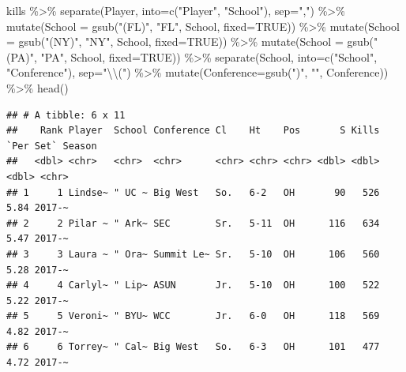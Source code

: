 \documentclass[
]{book}
\newenvironment{Shaded}{\begin{snugshade}}{\end{snugshade}}
\newcommand{\AttributeTok}[1]{\textcolor[rgb]{0.77,0.63,0.00}{#1}}
\newcommand{\ConstantTok}[1]{\textcolor[rgb]{0.00,0.00,0.00}{#1}}
\newcommand{\FunctionTok}[1]{\textcolor[rgb]{0.00,0.00,0.00}{#1}}
\newcommand{\NormalTok}[1]{#1}
\newcommand{\SpecialCharTok}[1]{\textcolor[rgb]{0.00,0.00,0.00}{#1}}
\newcommand{\StringTok}[1]{\textcolor[rgb]{0.31,0.60,0.02}{#1}}
\begin{document}
\begin{Shaded}
\begin{Highlighting}[]
\NormalTok{kills }\SpecialCharTok{\%\textgreater{}\%} 
  \FunctionTok{separate}\NormalTok{(Player, }\AttributeTok{into=}\FunctionTok{c}\NormalTok{(}\StringTok{"Player"}\NormalTok{, }\StringTok{"School"}\NormalTok{), }\AttributeTok{sep=}\StringTok{","}\NormalTok{) }\SpecialCharTok{\%\textgreater{}\%} 
  \FunctionTok{mutate}\NormalTok{(}\AttributeTok{School =} \FunctionTok{gsub}\NormalTok{(}\StringTok{"(FL)"}\NormalTok{, }\StringTok{"FL"}\NormalTok{, School, }\AttributeTok{fixed=}\ConstantTok{TRUE}\NormalTok{)) }\SpecialCharTok{\%\textgreater{}\%}
  \FunctionTok{mutate}\NormalTok{(}\AttributeTok{School =} \FunctionTok{gsub}\NormalTok{(}\StringTok{"(NY)"}\NormalTok{, }\StringTok{"NY"}\NormalTok{, School, }\AttributeTok{fixed=}\ConstantTok{TRUE}\NormalTok{)) }\SpecialCharTok{\%\textgreater{}\%}
  \FunctionTok{mutate}\NormalTok{(}\AttributeTok{School =} \FunctionTok{gsub}\NormalTok{(}\StringTok{"(PA)"}\NormalTok{, }\StringTok{"PA"}\NormalTok{, School, }\AttributeTok{fixed=}\ConstantTok{TRUE}\NormalTok{)) }\SpecialCharTok{\%\textgreater{}\%}
  \FunctionTok{separate}\NormalTok{(School, }\AttributeTok{into=}\FunctionTok{c}\NormalTok{(}\StringTok{"School"}\NormalTok{, }\StringTok{"Conference"}\NormalTok{), }\AttributeTok{sep=}\StringTok{"}\SpecialCharTok{\textbackslash{}\textbackslash{}}\StringTok{("}\NormalTok{) }\SpecialCharTok{\%\textgreater{}\%} 
  \FunctionTok{mutate}\NormalTok{(}\AttributeTok{Conference=}\FunctionTok{gsub}\NormalTok{(}\StringTok{")"}\NormalTok{, }\StringTok{""}\NormalTok{, Conference)) }\SpecialCharTok{\%\textgreater{}\%}
  \FunctionTok{head}\NormalTok{()}
\end{Highlighting}
\end{Shaded}

\begin{verbatim}
## # A tibble: 6 x 11
##    Rank Player  School Conference Cl    Ht    Pos       S Kills `Per Set` Season
##   <dbl> <chr>   <chr>  <chr>      <chr> <chr> <chr> <dbl> <dbl>     <dbl> <chr> 
## 1     1 Lindse~ " UC ~ Big West   So.   6-2   OH       90   526      5.84 2017-~
## 2     2 Pilar ~ " Ark~ SEC        Sr.   5-11  OH      116   634      5.47 2017-~
## 3     3 Laura ~ " Ora~ Summit Le~ Sr.   5-10  OH      106   560      5.28 2017-~
## 4     4 Carlyl~ " Lip~ ASUN       Jr.   5-10  OH      100   522      5.22 2017-~
## 5     5 Veroni~ " BYU~ WCC        Jr.   6-0   OH      118   569      4.82 2017-~
## 6     6 Torrey~ " Cal~ Big West   So.   6-3   OH      101   477      4.72 2017-~
\end{verbatim}
\end{document}
